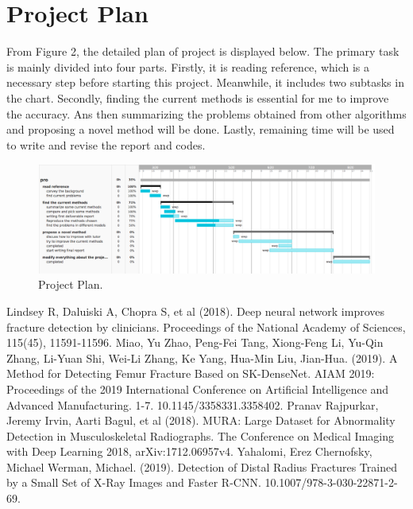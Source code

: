 \documentclass[12pt,oneside,a4paper]{article}
\begin{document}
\section{Project Plan}
From Figure 2, the detailed plan of project is displayed below. The primary task is mainly divided into four parts. Firstly, it is reading reference, which is a necessary step before starting this project. Meanwhile, it includes two subtasks in the chart. Secondly, finding the current methods is essential for me to improve the accuracy. Ans then summarizing the problems obtained from other algorithms and proposing a novel method will be done. Lastly, remaining time will be used to write and revise the report and codes.
\begin{figure}
\begin{center}
\includegraphics[width=1\columnwidth]{images/TaskGantt.png}
\caption{Project Plan.}
\end{center}
\end{figure}






\begin{thebibliography}{99}
Lindsey  R,  Daluiski  A,  Chopra  S,  et al  (2018).  Deep  neural  network  improves fracture  detection  by  clinicians.  Proceedings  of  the  National  Academy  of Sciences, 115(45), 11591-11596.  
 Miao, Yu Zhao, Peng-Fei Tang, Xiong-Feng Li, Yu-Qin Zhang, Li-Yuan Shi, Wei-Li Zhang, Ke Yang, Hua-Min Liu, Jian-Hua. (2019). A Method for Detecting Femur Fracture Based on SK-DenseNet. AIAM 2019: Proceedings of the 2019 International Conference on Artificial Intelligence and Advanced Manufacturing. 1-7. 10.1145/3358331.3358402. 
 Pranav Rajpurkar, Jeremy Irvin, Aarti Bagul, et al (2018). MURA: Large Dataset for Abnormality Detection in Musculoskeletal Radiographs. The Conference on Medical Imaging with Deep Learning 2018, arXiv:1712.06957v4. 
 Yahalomi, Erez Chernofsky, Michael Werman, Michael. (2019). Detection of Distal Radius Fractures Trained by a Small Set of X-Ray Images and Faster R-CNN. 10.1007/978-3-030-22871-2-69. 



\end{thebibliography}
\end{document}
